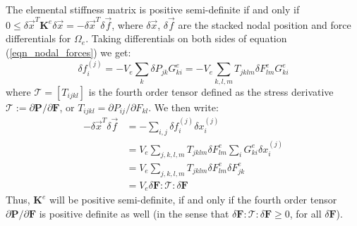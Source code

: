 The elemental stiffness matrix is positive semi-definite if and only if
$0\leq\delta\vec{x}^T\mathbf{K}^e\delta\vec{x}=-\delta\vec{x}^T\delta\vec{f}$, where $\delta\vec{x}$, $\delta\vec{f}$ are the stacked nodal position and force differentials for
$\Omega_e$. Taking differentials on both sides of equation (\ref{eqn_nodal_forces}) we get: 
$$
\delta f_i^{(j)}
=-V_e\sum_k\delta P_{jk}G_{ki}^e
=-V_e\sum_{k,l,m}T_{jklm}\delta F^e_{lm}G_{ki}^e
$$
where $\mathcal{T}=[T_{ijkl}]$ is the fourth order tensor defined as the stress derivative $\mathcal{T}:=\partial\mathbf{P}/\partial\mathbf{F}$, or $T_{ijkl}=\partial P_{ij}/\partial
F_{kl}$. We then write:
\begin{align}
-\delta\vec{x}^T\delta\vec{f}&=-\sum_{i,j}\delta f_i^{(j)}\delta x_i^{(j)}\nonumber\\
&=V_e\!\!\sum_{j,k,l,m}\!\!T_{jklm}\delta F^e_{lm}\sum_iG_{ki}^e\delta
x_i^{(j)}\nonumber\\
&=V_e\!\!\sum_{j,k,l,m}\!\!T_{jklm}\delta F^e_{lm}\delta
F^e_{jk}\nonumber\\
&=V_e\delta\mathbf{F}:\mathcal{T}:\delta\mathbf{F}\label{eqn:K_relation_to_T}
\end{align}
Thus, $\mathbf{K}^e$ will be positive semi-definite, if and only if the fourth order tensor $\partial\mathbf{P}/\partial\mathbf{F}$ is positive definite as well (in the sense that
$\delta\mathbf{F}:\mathcal{T}:\delta\mathbf{F}\geq 0$, for all
$\delta\mathbf{F}$). 

